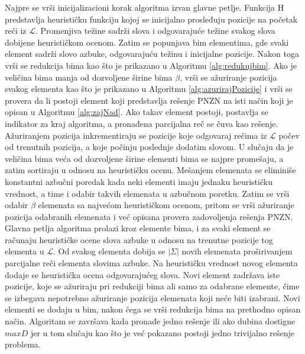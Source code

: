 \documentclass[12pt,oneside]{memoir}
\begin{document}
Najpre se vrši inicijalizacioni korak algoritma izvan glavne petlje.
Funkcija H predstavlja heurističku funkciju kojoj se inicijalno prosleđuju
pozicije na početak reči iz $\mathcal{L}$. Promenjiva težine sadrži slova i odgovarajuće
težine svakog slova dobijene heurističkom ocenom. Zatim se popunjava bim elementima, gde 
svaki element sadrži slovo azbuke, odgovarajuću težinu
i inicijalne pozicije. Nakon toga vrši se redukcija bima 
kao što je prikazano u Algoritmu \ref{alg:redukujbim}. Ako je veličina bima manja od
dozvoljene širine bima $\beta$, vrši se ažuriranje pozicija svakog elementa kao što je prikazano
u Algoritmu \ref{alg:azurirajPozicije} i vrši se provera da li postoji element koji predstavlja
rešenje PNZN na isti način koji je opisan u Algoritmu \ref{alg:zajNad}.
Ako takav element postoji, postavlja se indikator za kraj algoritma, a pronađena
parcijalna reč se čuva kao rešenje. Ažuriranjem pozicija inkrementiraju se pozicije koje odgovaraj
rečima iz $\mathcal{L}$ počev od trenutnih pozicija, a koje počinju poslednje dodatim slovom.
U slučaju da je veličina bima veća od dozvoljene širine elementi bima se najpre promešaju, a zatim
sortiraju u odnosu na heurističku ocenu. Mešanjem elemenata se eliminiše konstantni azbučni 
poredak kada neki elementi imaju jednaku heurističku vrednost, a time i odabir 
takvih elemenata u azbučnom poretku. Zatim se vrši odabir $\beta$ elemenata sa najvećom 
heurističkom ocenom, pritom se vrši ažuriranje pozicija odabranih elemenata i već opisana
provera zadovoljenja rešenja PNZN. Glavna petlja algoritma prolazi kroz elemente bima, 
i za svaki element se računaju heurističke ocene slova azbuke u odnosu na trenutne pozicije
tog elementa u $\mathcal{L}$. Od svakog elementa dobija se $|\Sigma|$ novih elemenata
proširivanjem parcijalne reči elementa slovima azbuke. Na heurističku vrednost novog elementa
dodaje se heuristička ocena odgovarajućeg slova. Novi element zadržava iste pozicije,
koje se ažuriraju pri redukciji bima ali samo za odabrane elemente, čime se 
izbegava nepotrebno ažuriranje pozicija elemenata koji neće biti izabrani.
Novi elementi se dodaju u bim, nakon čega se vrši redukcija bima na prethodno
opisan način. Algoritam se završava kada pronađe jedno rešenje ili
ako dubina dostigne $maxD$ jer u tom slučaju kao što je već pokazano postoji
jedno trivijalno rešenje problema.
\\
\end{document}
